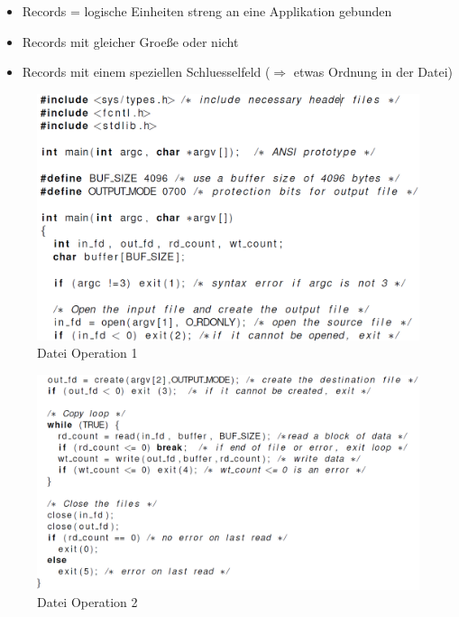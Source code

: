 \documentclass[a4paper]{scrreprt}
\begin{document}
\begin{itemize}
	\item Records = logische Einheiten streng an eine Applikation gebunden
	\item Records mit gleicher Groeße oder nicht
	\item Records mit einem speziellen Schluesselfeld ($\Rightarrow$ etwas Ordnung in der Datei)
\end{itemize}

\begin{figure}[ht]
\centering
\includegraphics[scale=0.4]{file_operation.png}
\caption{Datei Operation 1}
\end{figure}

\begin{figure}[ht]
\centering
\includegraphics[scale=0.4]{file_operation2.png}
\caption{Datei Operation 2}
\end{figure}
\end{document}
